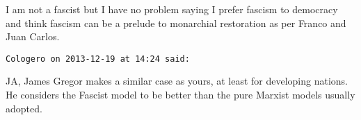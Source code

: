 \begin{footnotesize}
\begin{sffamily}
I am not a fascist but I have no problem saying I prefer fascism to democracy and think fascism can be a prelude to monarchial restoration as per Franco and Juan Carlos.

\hfill

\texttt{Cologero on 2013-12-19 at 14:24 said:}

JA, James Gregor makes a similar case as yours, at least for developing nations. He considers the Fascist model to be better than the pure Marxist models usually adopted.

\hfill

\end{sffamily}\end{footnotesize}
